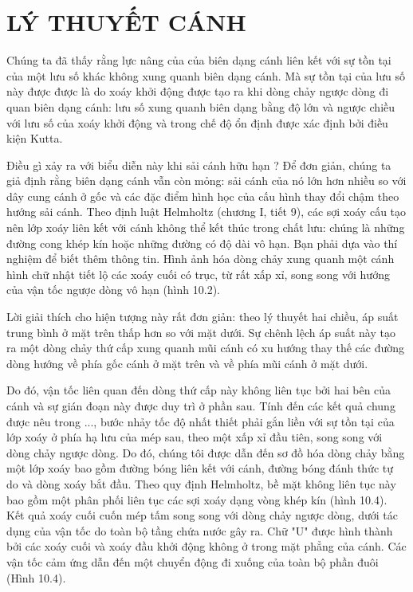 \documentclass[KHI_DONG_HOC.tex]{subfiles}
\begin{document}
\chapter{LÝ THUYẾT CÁNH}

        Chúng ta đã thấy rằng lực nâng của của biên dạng cánh liên kết với sự tồn tại của một lưu số khác không xung quanh biên dạng cánh. Mà sự tồn tại của lưu số này được được là do xoáy khởi động được tạo ra khi dòng chảy ngược dòng đi quan biên dạng cánh: lưu số xung quanh biên dạng bằng độ lớn và ngược chiều với lưu số của xoáy khởi động và trong chế độ ổn định được xác định bởi điều kiện Kutta.

        Điều gì xảy ra với biểu diễn này khi sải cánh hữu hạn ? Để đơn giản, chúng ta giả định rằng biên dạng cánh vẫn còn mỏng: sải cánh của nó lớn hơn nhiều so với dây cung cánh ở gốc và các đặc điểm hình học của cấu hình thay đổi chậm theo hướng sải cánh. Theo định luật Helmholtz (chương I, tiết 9), các sợi xoáy cấu tạo nên lớp xoáy liên kết với cánh không thể kết thúc trong chất lưu: chúng là những đường cong khép kín hoặc những đường có độ dài vô hạn. Bạn phải dựa vào thí nghiệm để biết thêm thông tin. Hình ảnh hóa dòng chảy xung quanh một cánh hình chữ nhật tiết lộ các xoáy cuối có trục, từ rất xấp xỉ, song song với hướng của vận tốc ngược dòng vô hạn (hình 10.2).

        Lời giải thích cho hiện tượng này rất đơn giản: theo lý thuyết hai chiều, áp suất trung bình ở mặt trên thấp hơn so với mặt dưới. Sự chênh lệch áp suất này tạo ra một dòng chảy thứ cấp xung quanh mũi cánh có xu hướng thay thế các đường dòng hướng về phía gốc cánh ở mặt trên và về phía mũi cánh ở mặt dưới.

        Do đó, vận tốc liên quan đến dòng thứ cấp này không liên tục bởi hai bên của cánh và sự gián đoạn này được duy trì ở phần sau. Tính đến các kết quả chung được nêu trong ..., bước nhảy tốc độ nhất thiết phải gắn liền với sự tồn tại của lớp xoáy ở phía hạ lưu của mép sau, theo một xấp xỉ đầu tiên, song song với dòng chảy ngược dòng. Do đó, chúng tôi được dẫn đến sơ đồ hóa dòng chảy bằng một lớp xoáy bao gồm đường bóng liên kết với cánh, đường bóng đánh thức tự do và dòng xoáy bắt đầu. Theo quy định Helmholtz, bề mặt không liên tục này bao gồm một phân phối liên tục các sợi xoáy dạng vòng khép kín (hình 10.4). Kết quả xoáy cuối cuốn mép tấm song song với dòng chảy ngược dòng, dưới tác dụng của vận tốc do toàn bộ tầng chứa nước gây ra. Chữ "U" được hình thành bởi các xoáy cuối và xoáy đầu khởi động không ở trong mặt phẳng của cánh. Các vận tốc cảm ứng dẫn đến một chuyển động đi xuống của toàn bộ phần đuôi (Hình 10.4).
\end{document}
